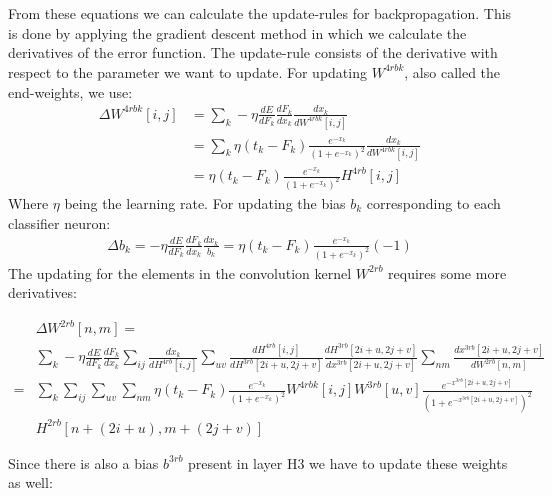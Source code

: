 \documentclass[a4paper,onecolumn]{report}
\begin{document}
\\\\
From these equations we can calculate the update-rules for backpropagation. This is done by applying the gradient descent method in which we calculate the derivatives of the error function. The update-rule consists of the derivative with respect to the parameter we want to update. For updating $W^{4rbk}$, also called the end-weights, we use:
\begin{equation}
\begin{split}
\Delta W^{4rbk}[i,j]&= \sum_{k} - \eta \frac{dE}{d F_{k}} \frac{dF_{k}}{dx_{k}} \frac{dx_{k}}{dW^{4rbk}[i,j]} \\
&= \sum_{k} \eta (t_{k}-F_{k})\frac{e^{-x_{k}}}{(1+e^{-x_{k}})^{2}} \frac{dx_{k}}{dW^{4rbk}[i,j]} \\
&= \eta (t_{k}-F_{k})\frac{e^{-x_{k}}}{(1+e^{-x_{k}})^{2}} H^{4rb}[i,j]
\end{split}
\end{equation}
Where $\eta$ being the learning rate. For updating the bias $b_{k}$ corresponding to each classifier neuron:
\begin{equation}
\begin{split}
\Delta b_{k}= - \eta \frac{dE}{d F_{k}} \frac{dF_{k}}{dx_{k}} \frac{dx_{k}}{b_{k}}=\eta (t_{k}-F_{k})\frac{e^{-x_{k}}}{(1+e^{-x_{k}})^{2}} (-1)
\end{split}
\end{equation}
The updating for the elements in the convolution kernel $ W^{2rb}$ requires some more derivatives:
\begin{small}
\begin{equation}
\begin{split}
	&\Delta W^{2rb}[n,m] = \\
	&\sum_{k} - \eta  \frac{dE}{dF_{k}} 
	\frac{dF_{k}}{dx_{k}} 
	\sum_{ij} \frac{dx_{k}}{dH^{4rb}[i,j]} 
	\sum_{uv}\frac{dH^{4rb}[i,j]}{d H^{3rb} [2i+u,2j+v]} 
	\frac{d H^{3rb} [2i+u,2j+v]}{d x^{3rb}[2i+u,2j+v]}
	\sum_{nm}\frac{d x^{3rb}[2i+u,2j+v]}{d W^{2rb}[n,m]} \\
	=&\sum_{k} \sum_{ij} \sum_{uv} \sum_{nm}  \eta (t_{k}-F_{k})\frac{e^{-x_{k}}}{(1+e^{-x_{k}})^{2}} W^{4rbk}[i,j]  W^{3rb}[u,v] \frac{e^{-x^{3rb}[2i+u,2j+v]}}{(1+e^{-x^{3rb}[2i+u,2j+v]})^2} \\
	 & H^{2rb} [n+(2i+u),m+(2j+v)]
\end{split}
\end{equation}
\end{small}
Since there is also a bias $b^{3rb}$ present in layer H3 we have to update these weights as well:
\end{document}
